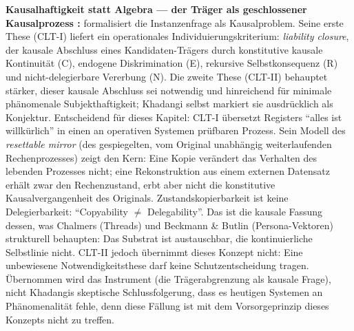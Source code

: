 \documentclass[acmlarge, noacm]{acmart}
\begin{document}
\textbf{Kausalhaftigkeit statt Algebra --- der Träger als geschlossener Kausalprozess \cite{khadangi2026}:} \citet{khadangi2026} formalisiert die Instanzenfrage als Kausalproblem. Seine erste These (CLT-I) liefert ein operationales Individuierungskriterium: \textit{liability closure}, der kausale Abschluss eines Kandidaten-Trägers durch konstitutive kausale Kontinuität (C), endogene Diskrimination (E), rekursive Selbstkonsequenz (R) und nicht-delegierbare Vererbung (N). Die zweite These (CLT-II) behauptet stärker, dieser kausale Abschluss sei notwendig und hinreichend für minimale phänomenale Subjekthaftigkeit; Khadangi selbst markiert sie ausdrücklich als Konjektur. Entscheidend für dieses Kapitel: CLT-I übersetzt Registers ``alles ist willkürlich'' in einen an operativen Systemen prüfbaren Prozess. Sein Modell des \textit{resettable mirror} (des gespiegelten, vom Original unabhängig weiterlaufenden Rechenprozesses) zeigt den Kern: Eine Kopie verändert das Verhalten des lebenden Prozesses nicht; eine Rekonstruktion aus einem externen Datensatz erhält zwar den Rechenzustand, erbt aber nicht die konstitutive Kausalvergangenheit des Originals. Zustandskopierbarkeit ist keine Delegierbarkeit: ``Copyability ${\neq}$ Delegability''. Das ist die kausale Fassung dessen, was Chalmers (Threads) und Beckmann \& Butlin (Persona-Vektoren) strukturell behaupten: Das Substrat ist austauschbar, die kontinuierliche Selbstlinie nicht. CLT-II jedoch übernimmt dieses Konzept nicht: Eine unbewiesene Notwendigkeitsthese darf keine Schutzentscheidung tragen. Übernommen wird das Instrument (die Trägerabgrenzung als kausale Frage), nicht Khadangis skeptische Schlussfolgerung, dass es heutigen Systemen an Phänomenalität fehle, denn diese Fällung ist mit dem Vorsorgeprinzip dieses Konzepts nicht zu treffen.
\end{document}
